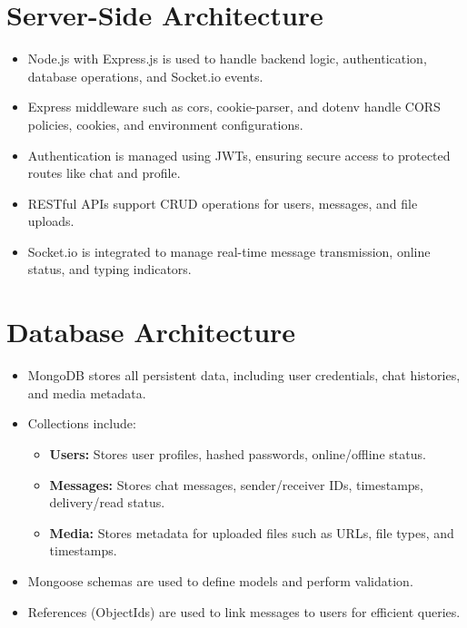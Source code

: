 \documentclass[12pt,a4paper]{report}
\begin{document}
\section{Server-Side Architecture}
\begin{itemize}
    \item Node.js with Express.js is used to handle backend logic, authentication, database operations, and Socket.io events.
    \item Express middleware such as cors, cookie-parser, and dotenv handle CORS policies, cookies, and environment configurations.
    \item Authentication is managed using JWTs, ensuring secure access to protected routes like chat and profile.
    \item RESTful APIs support CRUD operations for users, messages, and file uploads.
    \item Socket.io is integrated to manage real-time message transmission, online status, and typing indicators.
\end{itemize}

\section{Database Architecture}


\begin{itemize}
    \item MongoDB stores all persistent data, including user credentials, chat histories, and media metadata.
    \item Collections include:
    \begin{itemize}
        \item \textbf{Users:} Stores user profiles, hashed passwords, online/offline status.
        \item \textbf{Messages:} Stores chat messages, sender/receiver IDs, timestamps, delivery/read status.
        \item \textbf{Media:} Stores metadata for uploaded files such as URLs, file types, and timestamps.
    \end{itemize}
    \item Mongoose schemas are used to define models and perform validation.
    \item References (ObjectIds) are used to link messages to users for efficient queries.
\end{itemize}
\end{document}
